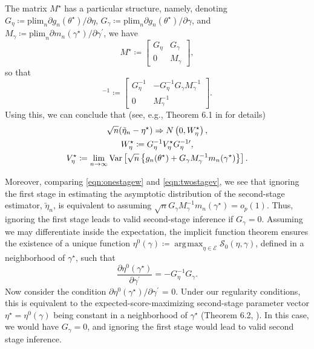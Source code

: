 \documentclass[12pt]{article}
\theoremstyle{definition}
\theoremstyle{remark}
\DeclareMathOperator*{\argmax}{\arg\!\max}
\begin{document}
The matrix $M^\star$ has a particular structure, namely, denoting $G_{\eta} \coloneqq \mathrm{plim}_n \partial g_{n}(\theta^\star) / \partial \eta$, $G_{\gamma} \coloneqq \mathrm{plim}_n \partial g_{n}(\theta^{\star}) / \partial \gamma$, and $M_{\gamma} \coloneqq \mathrm{plim}_n \partial m_{n}(\gamma^{\star}) / \partial \gamma^{\prime}$, we have 
\begin{equation*}
M^{\star} \coloneqq
\begin{bmatrix}
G_{\eta} & G_{\gamma} \\ 
0 & M_{\gamma}
\end{bmatrix},
\end{equation*}
so that 
\begin{equation*}
[M^\star]^{-1} \coloneqq 
\begin{bmatrix}
G^{-1}_{\eta} & -G_{\eta}^{-1}G_{\gamma} M^{-1}_{\gamma} \\ 
0 & M^{-1}_{\gamma} \end{bmatrix}.
\end{equation*}
Using this, we can conclude that (see, e.g., Theorem 6.1 in  for details) 
\begin{gather}
\sqrt{n}(\tilde{\eta}_{n} - \eta^\star) \Rightarrow N\left(0, W^{\star}_{\eta}\right), \notag \\
W^{\star}_{\eta} \coloneqq G_{\eta}^{-1} V^{\star}_{\eta} G_{\eta}^{-1\prime}, \notag \\
V^{\star}_{\eta} \coloneqq \lim_{n \to \infty} \text{Var} \left[ \sqrt{n} \left\{ g_{n}(\theta^{\star}) + G_{\gamma} M^{-1}_{\gamma} m_{n}(\gamma^{\star}) \right\} \right]. \label{eqn:twostagev}
\end{gather}

Moreover, comparing \eqref{eqn:onestagew} and \eqref{eqn:twostagev}, we see that ignoring the first stage in estimating the asymptotic distribution of the second-stage estimator, $\tilde{\eta}_n$, is equivalent to assuming $\sqrt{n} G_{\gamma} M^{-1}_{\gamma} m_n(\gamma^{\star}) = o_p(1)$. Thus, ignoring the first stage leads to valid second-stage inference if $G_{\gamma} = 0$. Assuming we may differentiate inside the expectation, the implicit function theorem ensures the existence of a unique function $\eta^0(\gamma) \coloneqq \argmax_{\eta \in \mathcal{E}} \mathcal{S}_0(\eta, \gamma)$, defined in a neighborhood of $\gamma^{\star}$, such that 
\begin{equation*}
\frac{\partial \eta^0(\gamma^{\star})}{\partial \gamma^{\prime}} = -G_{\eta}^{-1} G_{\gamma}.
\end{equation*}
Now consider the condition $\partial \eta^{0} (\gamma^{\star}) / \partial \gamma^{\prime}$ = 0. Under our regularity conditions, this is equivalent to the expected-score-maximizing second-stage parameter vector $\eta^{\star} = \eta^0(\gamma)$ being constant in a neighborhood of $\gamma^{\star}$ (Theorem 6.2, ). In this case, we would have $G_{\gamma} = 0$, and ignoring the first stage would lead to valid second stage inference.
\end{document}
